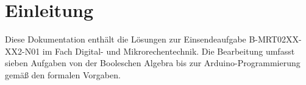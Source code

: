

\section{Einleitung}
Diese Dokumentation enthält die Lösungen zur Einsendeaufgabe B-MRT02XX-XX2-N01 im Fach Digital- und Mikrorechentechnik. Die Bearbeitung umfasst sieben Aufgaben von der Booleschen Algebra bis zur Arduino-Programmierung gemäß den formalen Vorgaben.

